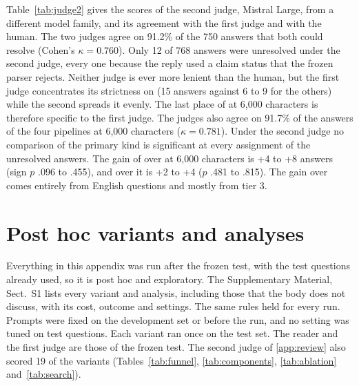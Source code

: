 Table~\ref{tab:judge2} gives the scores of the second judge, Mistral Large, from a different model family, and its agreement with the first judge and with the human.
The two judges agree on 91.2\% of the 750 answers that both could resolve (Cohen's $\kappa=0.760$).
Only 12 of 768 answers were unresolved under the second judge, every one because the reply used a claim status that the frozen parser rejects.
Neither judge is ever more lenient than the human, but the first judge concentrates its strictness on \setr{} (15 answers against 6 to 9 for the others) while the second spreads it evenly.
The last place of \setr{} at 6,000 characters is therefore specific to the first judge.
The judges also agree on 91.7\% of the answers of the four pipelines at 6,000 characters ($\kappa=0.781$).
Under the second judge no comparison of the primary kind is significant at every assignment of the unresolved answers.
The gain of \lexb{} over \hybrid{} at 6,000 characters is +4 to +8 answers (sign $p$ .096 to .455), and over \hr{} it is +2 to +4 ($p$ .481 to .815).
The gain over \hybrid{} comes entirely from English questions and mostly from tier 3.


\section{Post hoc variants and analyses}
\label{app:posthoc}
Everything in this appendix was run after the frozen test, with the test questions already used, so it is post hoc and exploratory.
The Supplementary Material, Sect.~S1 lists every variant and analysis, including those that the body does not discuss, with its cost, outcome and settings.
The same rules held for every run.
Prompts were fixed on the development set or before the run, and no setting was tuned on test questions.
Each variant ran once on the test set.
The reader and the first judge are those of the frozen test. The second judge of \ref{app:review} also scored 19 of the variants (Tables~\ref{tab:funnel}, \ref{tab:components}, \ref{tab:ablation} and~\ref{tab:search}). %

